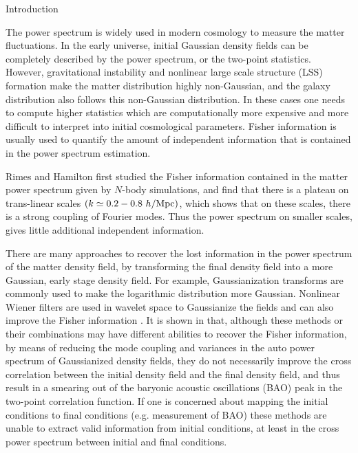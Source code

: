 \begin{section}{Introduction}\label{sec:introduction}  

The power spectrum is widely used in modern cosmology to measure the matter
fluctuations. In the early universe, initial Gaussian density fields
can be completely described by the power spectrum, or the two-point
statistics. However, gravitational instability and nonlinear large scale
structure (LSS) formation make the matter distribution highly
non-Gaussian, and the galaxy distribution also follows this non-Gaussian
distribution. In these cases one needs to compute higher statistics
which are computationally more expensive and more difficult to
interpret into initial cosmological parameters. Fisher information
is usually used to quantify the amount of independent information
that is contained in the power spectrum estimation.

Rimes and Hamilton \citep{bib:Rimes2006} first studied the Fisher
information contained in the matter power
spectrum given by $N$-body simulations, and find that there is a
plateau on trans-linear scales $(k \simeq 0.2-0.8\ h/{\rm Mpc})$,
which shows that on these scales, there is a strong coupling of
Fourier modes. Thus the power spectrum on smaller scales, gives little
additional independent information.

There are many approaches to recover the lost information in the
power spectrum of the matter density field, by transforming the final
density field into a more Gaussian, early stage density field.
For example, Gaussianization transforms are commonly used
\cite{bib:Weinberg1992,bib:Mark2009} to make the logarithmic
distribution more Gaussian. Nonlinear Wiener filters are used
in wavelet space to Gaussianize the fields and can also improve
the Fisher information \cite{bib:Zhang2011,bib:Yu2012,bib:HarnoisD2013}.
It is shown in \cite{bib:HarnoisD2013} that, although these methods
or their combinations may have different abilities to recover
the Fisher information, by means of reducing the mode coupling
and variances in the auto power spectrum of Gaussianized
density fields, they do not necessarily improve the cross correlation
 between the initial density
field and the final density field, and thus result in a smearing
out of the baryonic acoustic oscillations (BAO) peak in the two-point
correlation function. If one is concerned about mapping
the initial conditions to final conditions (e.g. measurement of 
BAO) these methods are unable to
extract valid information from initial conditions, at least in
the cross power spectrum between initial and final conditions.


\end{section}
